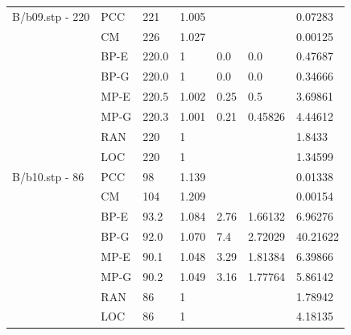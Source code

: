\documentclass[12pt,a4paper]{article}
\begin{document}
\begin{center}
\begin{tabular}{l|l|l|l|l|l|l}
		B/b09.stp - 220&PCC&221&1.005&&&0.07283\\
		&CM&226&1.027&&&0.00125\\
		&BP-E&220.0&1&0.0&0.0&0.47687\\
		&BP-G&220.0&1&0.0&0.0&0.34666\\
		&MP-E&220.5&1.002&0.25&0.5&3.69861\\
		&MP-G&220.3&1.001&0.21&0.45826&4.44612\\
		&RAN&220&1&&&1.8433\\
		&LOC&220&1&&&1.34599\\\hline
		B/b10.stp - 86&PCC&98&1.139&&&0.01338\\
		&CM&104&1.209&&&0.00154\\
		&BP-E&93.2&1.084&2.76&1.66132&6.96276\\
		&BP-G&92.0&1.070&7.4&2.72029&40.21622\\
		&MP-E&90.1&1.048&3.29&1.81384&6.39866\\
		&MP-G&90.2&1.049&3.16&1.77764&5.86142\\
		&RAN&86&1&&&1.78942\\
		&LOC&86&1&&&4.18135\\\hline
	\end{tabular}
\end{center}
\end{document}
